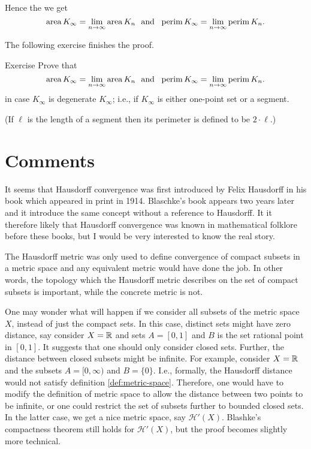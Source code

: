 Hence the we get 
$$\area K_\infty=\lim_{n\to\infty}\area K_n
\ \ \text{and}\ \ 
\per K_\infty=\lim_{n\to\infty}\per K_n.$$ 

The following exercise finishes the proof.\qeds

\begin{thm}{Exercise}\label{ex:area+perim}
Prove that  
$$\area K_\infty=\lim_{n\to\infty}\area K_n
\ \ \text{and}\ \ 
\per K_\infty=\lim_{n\to\infty}\per K_n.$$
in case $K_\infty$ is degenerate $K_\infty$;
i.e., if $K_\infty$ is either one-point set or a segment.

(If $\ell$ is the length of a segment then its perimeter is defined to be $2\cdot\ell$.)
\end{thm}

\section{Comments}

It seems that Hausdorff convergence was first introduced by Felix Hausdorff in his book \cite{hausdorff} which appeared in print in 1914.
Blaschke's book appears two years later and it introduce the same concept without
a reference to Hausdorff.
It it therefore likely that Hausdorff convergence was known in mathematical folklore before these books,
but I would be very interested to know the real story.

The Hausdorff metric was only used to 
define convergence of compact subsets in a metric space
and any equivalent metric would have done the job.
In other words, the topology which the Hausdorff metric describes on the 
set of compact subsets is important, while the concrete metric is not.

One may wonder what will happen if we consider all subsets of the metric space $X$,
instead of just the compact sets.
In this case, distinct sets might have zero distance, 
say consider $X=\mathbb{R}$
and sets $A=[0,1]$
and $B$ is the set rational point in $[0,1]$.
It suggests that one should only consider closed sets.
Further, the distance between closed subsets might be infinite. 
For example, consider $X=\mathbb{R}$ and the subsets $A=[0,\infty)$ and $B=\{0\}$.
I.e., formally, the Hausdorff distance would not satisfy definition \ref{def:metric-space}.
Therefore, one would have to modify the definition of metric space to allow the distance between two points to be infinite,
or one could restrict the set of subsets further to bounded closed sets.
In the latter case, we get a nice metric space, say $\mathcal{H}'(X)$.
Blashke's compactness theorem still holds for $\mathcal{H}'(X)$, but the proof becomes slightly more technical. 


